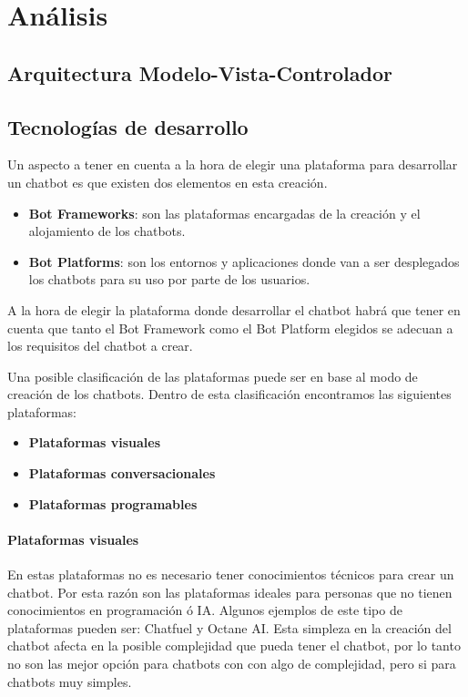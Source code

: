 \chapter{Análisis}


\section{Arquitectura Modelo-Vista-Controlador}




\section{Tecnologías de desarrollo}

Un aspecto a tener en cuenta a la hora de elegir una plataforma para desarrollar un chatbot es que existen dos elementos en esta creación.

\begin{itemize}
    \item \textbf{Bot Frameworks}: son las plataformas encargadas de la creación y el alojamiento de los chatbots.
    \item \textbf{Bot Platforms}: son los entornos y aplicaciones donde van a ser desplegados los chatbots para su uso por parte de los usuarios.
\end{itemize}

A la hora de elegir la plataforma donde desarrollar el chatbot habrá que tener en cuenta que tanto el Bot Framework como el Bot Platform elegidos se adecuan a los requisitos del chatbot a crear.

Una posible clasificación de las plataformas puede ser en base al modo de creación de los chatbots. Dentro de esta clasificación encontramos las siguientes plataformas:

\begin{itemize}
    \item \textbf{Plataformas visuales}
    \item \textbf{Plataformas conversacionales}
    \item \textbf{Plataformas programables}
\end{itemize}

\subsubsection*{Plataformas visuales}

En estas plataformas no es necesario tener conocimientos técnicos para crear un chatbot. Por esta razón son las plataformas ideales para personas que no tienen conocimientos en programación ó IA. Algunos ejemplos de este tipo de plataformas pueden ser: Chatfuel y Octane AI. Esta simpleza en la creación del chatbot afecta en la posible complejidad que pueda tener el chatbot, por lo tanto no son las mejor opción para chatbots con con algo de complejidad, pero si para chatbots muy simples.

